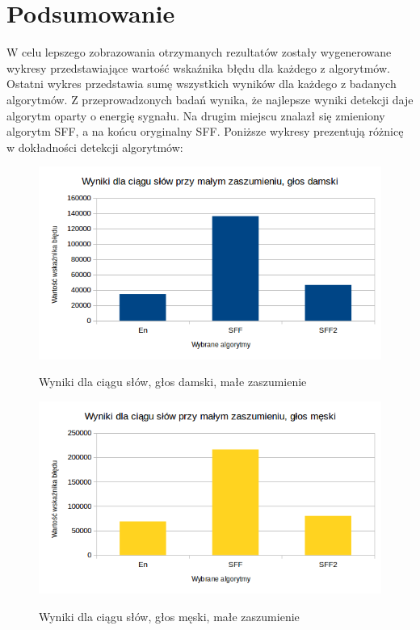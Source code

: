 \documentclass[eng,printmode]{mgr}
\begin{document}
\chapter{Podsumowanie}

W celu lepszego zobrazowania otrzymanych rezultatów zostały wygenerowane wykresy przedstawiające wartość wskaźnika błędu dla każdego z algorytmów. Ostatni wykres przedstawia sumę wszystkich wyników dla każdego z badanych algorytmów.
Z przeprowadzonych badań wynika, że najlepsze wyniki detekcji daje algorytm oparty o energię sygnału. Na drugim miejscu znalazł się zmieniony algorytm SFF, a na końcu oryginalny SFF. Poniższe wykresy prezentują różnicę w dokładności detekcji algorytmów:

\begin{figure}
	\begin{center}
		{\includegraphics[scale=1]{dbi03w1s14results.png}}
		\caption{Wyniki dla ciągu słów, głos damski, małe zaszumienie}\vspace{5mm}
	\end{center}
\end{figure}

\begin{figure}
	\begin{center}
		{\includegraphics[scale=1]{mwr35w1s14results.png}}
		\caption{Wyniki dla ciągu słów, głos męski, małe zaszumienie}\vspace{5mm}
	\end{center}
\end{figure}
\end{document}
